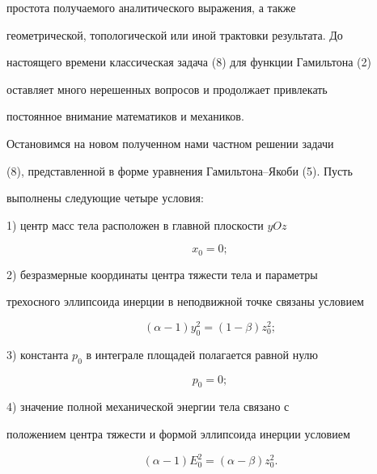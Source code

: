 простота получаемого аналитического выражения, а также


геометрической, топологической или иной трактовки результата. До


настоящего времени классическая задача (8) для функции Гамильтона (2)


оставляет много нерешенных вопросов и продолжает привлекать


постоянное внимание математиков и механиков.





Остановимся на новом полученном нами частном решении задачи


(8), представленной в форме уравнения Гамильтона--Якоби (5). Пусть


выполнены следующие четыре условия:





1) центр масс тела расположен в главной плоскости $yOz$


\begin{equation}


x_0=0;


\end{equation}





2) безразмерные координаты центра тяжести тела и параметры


трехосного эллипсоида инерции в неподвижной точке связаны условием


\begin{equation}


(\alpha-1)y^2_0=(1-\beta)z^2_0;


\end{equation}





3) константа $p_0$ в интеграле площадей полагается равной нулю


\begin{equation}


p_0=0;


\end{equation}





4) значение полной механической энергии тела связано с


положением центра тяжести и формой эллипсоида инерции условием


\begin{equation}


(\alpha-1)E^2_0=(\alpha-\beta)z^2_0.


\end{equation}





